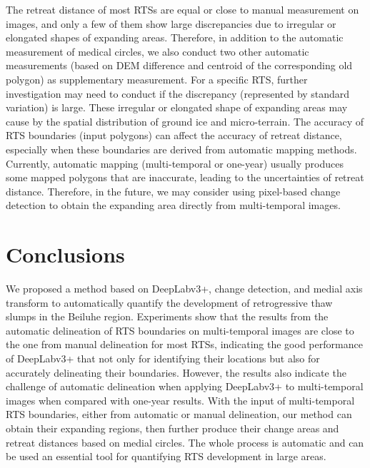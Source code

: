 \documentclass[authoryear,preprint,review,12pt]{elsarticle}
\begin{document}
The retreat distance of most RTSs are equal or close to manual measurement on images, and only a few of them show large discrepancies due to irregular or elongated shapes of expanding areas. 
Therefore, in addition to the automatic measurement of medical circles, we also conduct two other automatic measurements (based on DEM difference and centroid of the corresponding old polygon) as supplementary measurement. 
For a specific RTS, further investigation may need to conduct if the discrepancy (represented by standard variation) is large. 
These irregular or elongated shape of expanding areas may cause by the spatial distribution of ground ice and micro-terrain.
The accuracy of RTS boundaries (input polygons) can affect the accuracy of retreat distance, especially when these boundaries are derived from automatic mapping methods. 
Currently, automatic mapping (multi-temporal or one-year) usually produces some mapped polygons that are inaccurate, leading to the uncertainties of retreat distance. 
Therefore, in the future, we may consider using pixel-based change detection to obtain the expanding area directly from multi-temporal images. 



%


\section{Conclusions}
\label{sec_conclusion}

We proposed a method based on DeepLabv3+, change detection, and medial axis transform to automatically quantify the development of retrogressive thaw slumps in the Beiluhe region. 
Experiments show that the results from the automatic delineation of RTS boundaries on multi-temporal images are close to the one from manual delineation for most RTSs, indicating the good performance of DeepLabv3+  that not only for identifying their locations but also for accurately delineating their boundaries. 
However, the results also indicate the challenge of automatic delineation when applying DeepLabv3+ to multi-temporal images when compared with one-year results. 
With the input of multi-temporal RTS boundaries, either from automatic or manual delineation, our method can obtain their expanding regions, then further produce their change areas and retreat distances based on medial circles. 
The whole process is automatic and can be used an essential tool for quantifying RTS development in large areas. 
\end{document}
